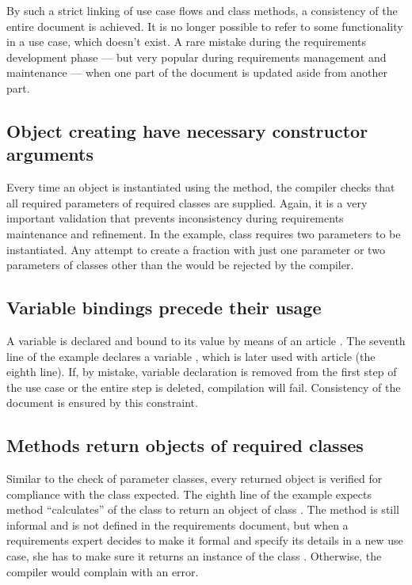 \documentclass[sigplan,10pt]{acmart}
\begin{document}
By such a strict linking of use case flows and class methods, a consistency
of the entire document is achieved. It is no longer possible to refer to
some functionality in a use case, which doesn't exist. A rare mistake during
the requirements development phase --- but very popular during requirements
management and maintenance --- when one part of the document is updated aside
from another part.

\subsection{Object creating have necessary constructor arguments}

Every time an object is instantiated using the  method,
the compiler checks that all required parameters of required classes are
supplied. Again, it is a very important validation that prevents inconsistency
during requirements maintenance and refinement. In the example, class
 requires two parameters to be instantiated. Any attempt to
create a fraction with just one parameter or two parameters of classes other
than the  would be rejected by the compiler.

\subsection{Variable bindings precede their usage}

A variable is declared and bound to its value by means of an article
. The seventh line of the example declares a variable
, which is later used with article  (the eighth
line). If, by mistake, variable declaration is removed from the first step
of the use case or the entire step is deleted, compilation will fail.
Consistency of the document is ensured by this constraint.

\subsection{Methods return objects of required classes}

Similar to the check of parameter classes, every returned object is verified
for compliance with the class expected. The eighth line of the example
expects method ``calculates'' of the class  to return an object
of class . The method is still informal and is not defined in
the requirements document, but when a requirements expert decides to make it
formal and specify its details in a new use case, she has to make sure it
returns an instance of the class . Otherwise, the compiler would
complain with an error.
\end{document}
